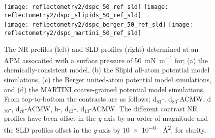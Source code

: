 %
%
\begin{figure}
    \centering
    \texttt{[image: reflectometry2/dspc\_50\_ref\_sld]}
    \texttt{[image: reflectometry2/dspc\_slipids\_50\_ref\_sld]}\\
    \texttt{[image: reflectometry2/dspc\_berger\_50\_ref\_sld]}
    \texttt{[image: reflectometry2/dspc\_martini\_50\_ref\_sld]}
    \caption{The NR profiles (left) and SLD profiles (right) determined at an APM assocaited with a surface pressure of \SI{50}{\milli\newton\per\meter} for; (a) the chemically-consistent model, (b) the Slipid all-atom potential model simulations, (c) the Berger united-atom potential model simulations, and (d) the MARTINI coarse-grained potential model simulations. From top-to-bottom the contrasts are as follows; d$_{83}$-, d$_{83}$-ACMW, d$_{70}$-, d$_{70}$-ACMW, h-, d$_{13}$-, d$_{13}$-ACMW. The different contrast NR profiles have been offset in the \emph{y}-axis by an order of magnitude and the SLD profiles offset in the \emph{y}-axis by \SI{10e-6}{\per\angstrom\squared}, for clarity.}
    \label{fig:dspcccref30}
\end{figure}
%
%
